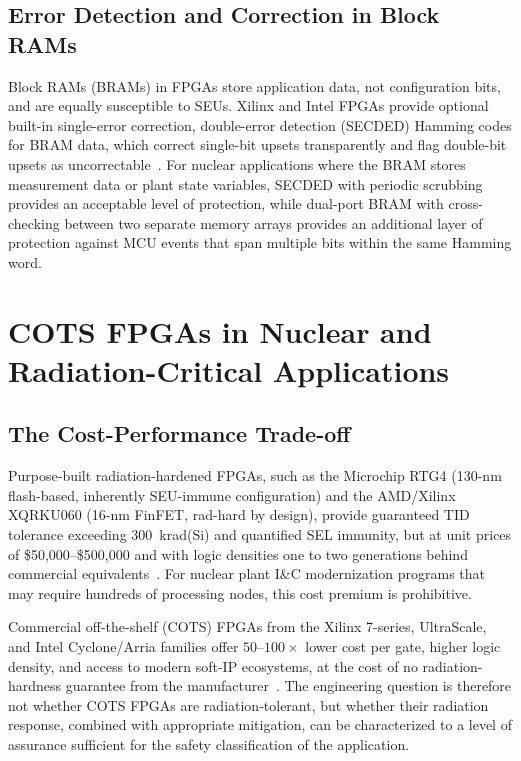 \subsection{Error Detection and Correction in Block RAMs}

Block RAMs (BRAMs) in FPGAs store application data, not
configuration bits, and are equally susceptible to SEUs.
Xilinx and Intel FPGAs provide optional built-in single-error
correction, double-error detection (SECDED) Hamming codes for
BRAM data, which correct single-bit upsets transparently and
flag double-bit upsets as uncorrectable~\cite{morgan2007comparison}.
For nuclear applications where the BRAM stores measurement data
or plant state variables, SECDED with periodic scrubbing provides
an acceptable level of protection, while dual-port BRAM with
cross-checking between two separate memory arrays provides an
additional layer of protection against MCU events that span
multiple bits within the same Hamming word.

\section{COTS FPGAs in Nuclear and Radiation-Critical Applications}
\label{sec:COTS_nuclear}

\subsection{The Cost-Performance Trade-off}

Purpose-built radiation-hardened FPGAs, such as the Microchip
RTG4 (130-nm flash-based, inherently SEU-immune configuration)
and the AMD/Xilinx XQRKU060 (16-nm FinFET, rad-hard by design),
provide guaranteed TID tolerance exceeding 300~krad(Si) and
quantified SEL immunity, but at unit prices of \$50,000--\$500,000
and with logic densities one to two generations behind commercial
equivalents~\cite{Microchip_RTG4,AMD_XQRKU060}.  For nuclear
plant I\&C modernization programs that may require hundreds of
processing nodes, this cost premium is prohibitive.

Commercial off-the-shelf (COTS) FPGAs from the Xilinx 7-series,
UltraScale, and Intel Cyclone/Arria families offer $50$--$100\times$
lower cost per gate, higher logic density, and access to modern
soft-IP ecosystems, at the cost of no radiation-hardness guarantee
from the manufacturer~\cite{BISResearch_RadHardFPGA}.  The
engineering question is therefore not whether COTS FPGAs are
radiation-tolerant, but whether their radiation response, combined
with appropriate mitigation, can be characterized to a level of
assurance sufficient for the safety classification of the
application.

